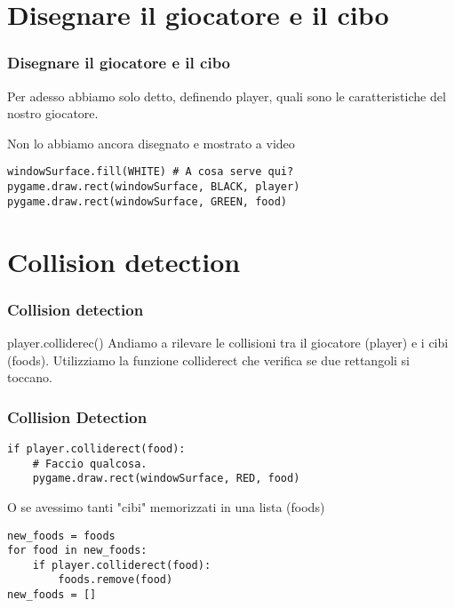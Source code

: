 \documentclass{beamer}
\begin{document}
\section{Disegnare il giocatore e il cibo}

\begin{frame}[fragile]
\frametitle{Disegnare il giocatore e il cibo}

Per adesso abbiamo solo detto, definendo player, quali sono le caratteristiche del nostro giocatore.

Non lo abbiamo ancora disegnato e mostrato a video

\begin{lstlisting}
windowSurface.fill(WHITE) # A cosa serve qui?
pygame.draw.rect(windowSurface, BLACK, player)
pygame.draw.rect(windowSurface, GREEN, food)
\end{lstlisting}

\end{frame}

\section{Collision detection}

\begin{frame}[fragile]
\frametitle{Collision detection}

\begin{block}{player.colliderec()}
Andiamo a rilevare le collisioni tra il giocatore (player) e i cibi (foods).
Utilizziamo la funzione colliderect che verifica se due rettangoli si toccano.
\end{block}
\end{frame}

\begin{frame}[fragile]
\frametitle{Collision Detection}

\begin{lstlisting}
if player.colliderect(food):
    # Faccio qualcosa.
    pygame.draw.rect(windowSurface, RED, food)
\end{lstlisting}

O se avessimo tanti "cibi" memorizzati in una lista (foods)

\begin{lstlisting}
new_foods = foods
for food in new_foods:
    if player.colliderect(food):
        foods.remove(food)
new_foods = []
\end{lstlisting}

\end{frame}
\end{document}
